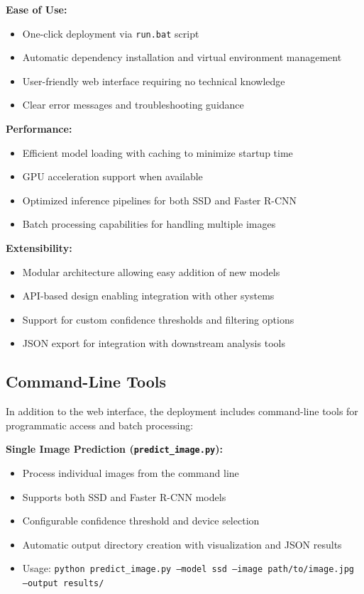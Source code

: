 \documentclass[12pt,a4paper]{article}
\begin{document}
\textbf{Ease of Use:}
\begin{itemize}
    \item One-click deployment via \texttt{run.bat} script
    \item Automatic dependency installation and virtual environment management
    \item User-friendly web interface requiring no technical knowledge
    \item Clear error messages and troubleshooting guidance
\end{itemize}

\textbf{Performance:}
\begin{itemize}
    \item Efficient model loading with caching to minimize startup time
    \item GPU acceleration support when available
    \item Optimized inference pipelines for both SSD and Faster R-CNN
    \item Batch processing capabilities for handling multiple images
\end{itemize}

\textbf{Extensibility:}
\begin{itemize}
    \item Modular architecture allowing easy addition of new models
    \item API-based design enabling integration with other systems
    \item Support for custom confidence thresholds and filtering options
    \item JSON export for integration with downstream analysis tools
\end{itemize}

\subsection{Command-Line Tools}

In addition to the web interface, the deployment includes command-line tools for programmatic access and batch processing:

\textbf{Single Image Prediction (\texttt{predict\_image.py}):}
\begin{itemize}
    \item Process individual images from the command line
    \item Supports both SSD and Faster R-CNN models
    \item Configurable confidence threshold and device selection
    \item Automatic output directory creation with visualization and JSON results
    \item Usage: \texttt{python predict\_image.py --model ssd --image path/to/image.jpg --output results/}
\end{itemize}
\end{document}
